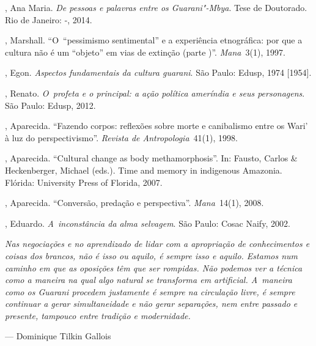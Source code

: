 \begin{Parskip}
  , Ana Maria. \emph{De pessoas e palavras entre os Guarani"-Mbya}.
Tese de Doutorado. Rio de Janeiro: -, 2014.

, Marshall. ``O~``pessimismo sentimental'' e a experiência
etnográfica: por que a cultura não é um ``objeto'' em vias de extinção
(parte )''. \emph{Mana~}3(1), 1997.

, Egon. \emph{Aspectos fundamentais da cultura guarani}. São Paulo:
Edusp, 1974 [1954].

, Renato. \emph{O~profeta e o principal: a ação política ameríndia e
seus personagens}. São Paulo: Edusp, 2012.

, Aparecida. ``Fazendo corpos: reflexões sobre morte e canibalismo
entre os Wari’ à luz do perspectivismo''. \emph{Revista de Antropologia}~41(1),
1998.

, Aparecida. ``Cultural change as body methamorphosis''. In: Fausto,
Carlos \& Heckenberger, Michael (eds.). Time and memory in indigenous
Amazonia. Flórida: University Press of Florida, 2007.

, Aparecida. ``Conversão, predação e perspectiva''. \emph{Mana~}14(1), 2008.

  , Eduardo. \emph{A~inconstância da alma selvagem}. São Paulo:
Cosac Naify, 2002.
\end{Parskip}

\clearpage

\vspace*{\fill}

\begin{flushleft}
\begin{minipage}[c]{0.85\textwidth}
\raggedright
\footnotesize
\emph{Nas negociações e no aprendizado de lidar com a apropriação de
conhecimentos e coisas dos brancos, não é isso \emph{ou} aquilo, é sempre isso
\emph{e} aquilo. Estamos num caminho em que as oposições têm que ser rompidas.
Não podemos ver a técnica como a maneira na qual algo natural se
transforma em artificial. A~maneira como os Guarani procedem justamente
é sempre na circulação livre, é sempre continuar a gerar simultaneidade
e não gerar separações, nem entre passado e presente, tampouco entre
tradição e modernidade.}

\smallskip
\hspace*{\fill}--- Dominique Tilkin Gallois
\end{minipage}
\end{flushleft}

